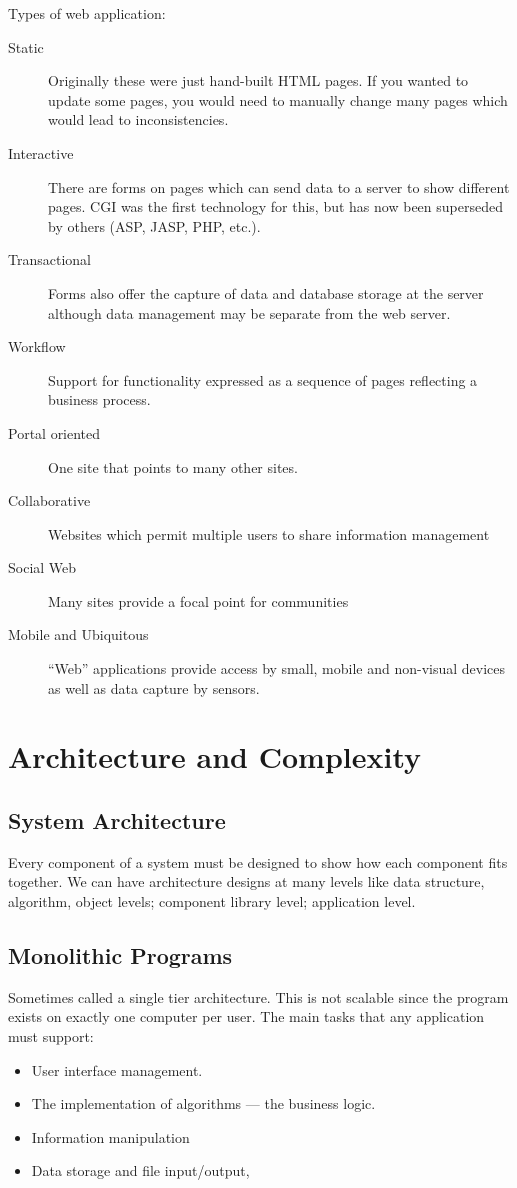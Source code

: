 Types of web application:
\begin{description}
	\item[Static] Originally these were just hand-built HTML pages.
		If you wanted to update some pages, you would need to manually change many pages which would lead to inconsistencies.
	\item[Interactive] There are forms on pages which can send data to a server to show different pages.
		CGI was the first technology for this, but has now been superseded by others (ASP, JASP, PHP, etc.).
	\item[Transactional] Forms also offer the capture of data and database storage at the server although data management may be separate from the web server.
	\item[Workflow] Support for functionality expressed as a sequence of pages reflecting a business process.
	\item[Portal oriented] One site that points to many other sites.
	\item[Collaborative] Websites which permit multiple users to share information management
	\item[Social Web] Many sites provide a focal point for communities
	\item[Mobile and Ubiquitous] ``Web'' applications provide access by small, mobile and non-visual devices as well as data capture by sensors.
\end{description}

\section{Architecture and Complexity}\label{sec:architecture_and_complexity}

\subsection{System Architecture}\label{sub:system_architecure}

Every component of a system must be designed to show how each component fits together.
We can have architecture designs at many levels like data structure, algorithm, object levels; component library level; application level.

\subsection{Monolithic Programs}\label{sub:monolithic_programs}

Sometimes called a single tier architecture.
This is not scalable since the program exists on exactly one computer per user.
The main tasks that any application must support:
\begin{itemize}
	\item User interface management.
	\item The implementation of algorithms --- the business logic.
	\item Information manipulation
	\item Data storage and file input/output,
\end{itemize}

